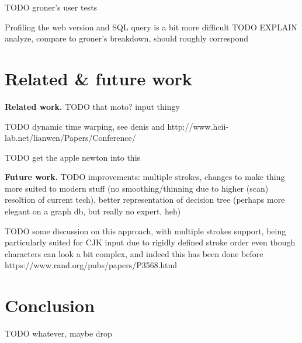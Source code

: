 \documentclass[sigconf]{acmart}
\begin{document}
TODO groner's user tests

Profiling the web version and SQL query is a bit more difficult TODO EXPLAIN analyze, compare to groner's breakdown, should roughly correspond

\section{Related \& future work}

\textbf{Related work.} TODO that moto? input thingy

TODO dynamic time warping, see denis and http://www.hcii-lab.net/lianwen/Papers/Conference/%

TODO get the apple newton into this

\textbf{Future work.} TODO improvements: multiple strokes, changes to make thing more suited to modern stuff (no smoothing/thinning due to higher (scan) resoltion of current tech), better representation of decision tree (perhaps more elegant on a graph db, but really no expert, heh)

TODO some discussion on this approach, with multiple strokes support, being particularly suited for CJK input due to rigidly defined stroke order even though characters can look a bit complex, and indeed this has been done before https://www.rand.org/pubs/papers/P3568.html


\section{Conclusion}

TODO whatever, maybe drop



\end{document}
